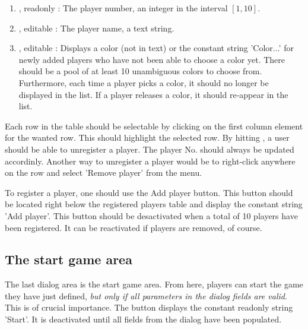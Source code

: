   \begin{enumerate}
    \item {},     readonly : The player number, an integer in the
                                           interval $[1, 10]$.
    \item {},     editable : The player name, a text string.
    \item {}, editable : Displays a color (not in text) or
                                           the constant string 'Color...' for
                                           newly added players who have not been
                                           able to choose a color yet. There
                                           should be a pool of at least 10
                                           unambiguous colors to choose from.
                                           Furthermore, each time a player
                                           picks a color, it should no longer
                                           be displayed in the list. If a
                                           player releases a color, it should
                                           re-appear in the list.
  \end{enumerate}

  Each row in the table should be selectable by clicking on the first column
  element for the wanted row. This should highlight the selected row. By hitting
  \Del, a user should be able to unregister a player. The player No. should
  always be updated accordinly. Another way to unregister a player would be to
  right-click anywhere on the row and select 'Remove player' from the menu.

  To register a player, one should use the Add player button. This button should
  be located right below the registered players table and display the constant
  string 'Add player'. This button should be desactivated when a total of 10
  players have been registered. It can be reactivated if players are removed,
  of course.


  \subsection{The start game area}
  The last dialog area is the start game area. From here, players can start the
  game they have just defined, \textit{but only if all parameters in the dialog
  fields are valid}. This is of crucial importance. The button displays the
  constant readonly string 'Start'. It is deactivated until all fields from the
  dialog have been populated.

